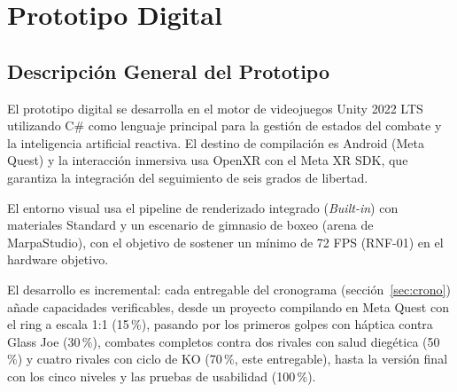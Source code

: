 \section{Prototipo Digital}
\subsection{Descripción General del Prototipo}
El prototipo digital se desarrolla en el motor de videojuegos Unity 2022 LTS utilizando C\# como lenguaje principal para la gestión de estados del combate y la inteligencia artificial reactiva. El destino de compilación es Android (Meta Quest) y la interacción inmersiva usa OpenXR con el Meta XR SDK, que garantiza la integración del seguimiento de seis grados de libertad.

El entorno visual usa el pipeline de renderizado integrado (\emph{Built-in}) con materiales Standard y un escenario de gimnasio de boxeo (arena de MarpaStudio), con el objetivo de sostener un mínimo de 72 FPS (RNF-01) en el hardware objetivo.

El desarrollo es incremental: cada entregable del cronograma (sección~\ref{sec:crono}) añade capacidades verificables, desde un proyecto compilando en Meta Quest con el ring a escala 1:1 (15\,\%), pasando por los primeros golpes con háptica contra Glass Joe (30\,\%), combates completos contra dos rivales con salud diegética (50\,\%) y cuatro rivales con ciclo de KO (70\,\%, este entregable), hasta la versión final con los cinco niveles y las pruebas de usabilidad (100\,\%).
